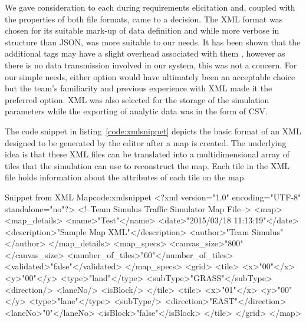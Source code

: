 We gave consideration to each during requirements elicitation and, coupled with the properties of both file formats, came to a decision.  The XML format was chosen for its suitable mark-up of data definition and while more verbose in structure than JSON, was more suitable to our needs.  It has been shown that the additional tags may have a slight overhead associated with them \cite{codeproject2013}, however as there is no data transmission involved in our system, this was not a concern.  For our simple needs, either option would have ultimately been an acceptable choice but the team's familiarity and previous experience with XML made it the preferred option.  XML was also selected for the storage of the simulation parameters while the exporting of analytic data was in the form of CSV. 

The code snippet in listing~\ref{code:xmlsnippet} depicts the basic format of an XML designed to be generated by the editor after a map is created. The underlying idea is that these XML files can be translated into a multidimensional array of tiles that the simulation can use to reconstruct the map. Each tile in the XML file holds information about the attributes of each tile on the map.

\begin{xml-code}{Snippet from XML Map}{code:xmlsnippet}
<?xml version="1.0" encoding="UTF-8" standalone="no"?>
<!--Team Simulus Traffic Simulator Map File-->
<map>
  <map_details>
    <name>"Test"</name>
    <date>"2015/03/18 11:13:19"</date>
    <description>"Sample Map XML"</description>
    <author>"Team Simulus"</author>
  </map_details>
  <map_specs>
    <canvas_size>"800"</canvas_size>
    <number_of_tiles>"60"</number_of_tiles>
    <validated>"false"</validated>
  </map_specs>
  <grid>
    <tile>
      <x>"00"</x>
      <y>"00"</y>
      <type>"land"</type>
      <subType>"GRASS"</subType>
      <direction/>
      <laneNo/>
      <isBlock/>
    </tile>
    <tile>
      <x>"01"</x>
      <y>"00"</y>
      <type>"lane"</type>
      <subType/>
      <direction>"EAST"</direction>
      <laneNo>"0"</laneNo>
      <isBlock>"false"</isBlock>
    </tile>
  </grid>
</map>
\end{xml-code}


